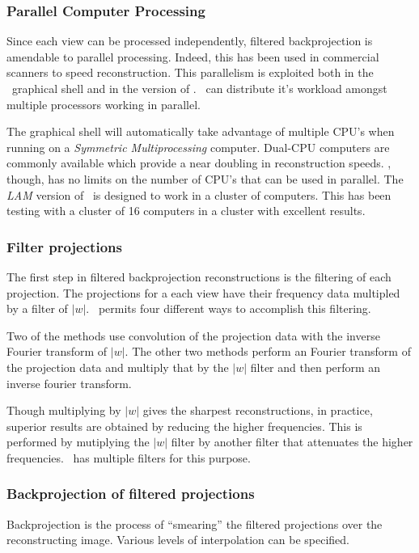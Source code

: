\subsubsection{Parallel Computer Processing}
Since each view can be processed independently, filtered backprojection is amendable to
parallel processing. Indeed, this has been used in commercial scanners to speed reconstruction.
This parallelism is exploited both in the \ctsim\ graphical shell and
in the  version of \ctsimtext. \ctsim\ can distribute it's workload
amongst multiple processors working in parallel.

The graphical shell will automatically take advantage of multiple CPU's when
running on a \emph{Symmetric Multiprocessing}
computer. Dual-CPU computers are commonly available which provide a near doubling
in reconstruction speeds. \ctsim, though, has no limits on the number of CPU's
that can be used in parallel. The \emph{LAM} version
of \ctsimtext\ is designed to work in a cluster of computers.
This has been testing with a cluster of 16 computers in a
 cluster with excellent
results.

\subsubsection{Filter projections}
The first step in filtered backprojection reconstructions is the filtering
of each projection. The projections for a each view have their frequency data multipled by
a filter of $|w|$. \ctsim\ permits four different ways to accomplish this
filtering.

Two of the methods use convolution of the projection data with the
inverse Fourier transform of $|w|$. The other two methods perform an Fourier
transform of the projection data and multiply that by the $|w|$ filter and
then perform an inverse fourier transform.

Though multiplying by $|w|$ gives the sharpest reconstructions, in
practice, superior results are obtained by reducing the higher
frequencies. This is performed by mutiplying the $|w|$ filter by
another filter that attenuates the higher frequencies. \ctsim\ has
multiple filters for this purpose.

\subsubsection{Backprojection of filtered projections}
Backprojection is the process of ``smearing'' the filtered
projections over the reconstructing image. Various levels of
interpolation can be specified.

